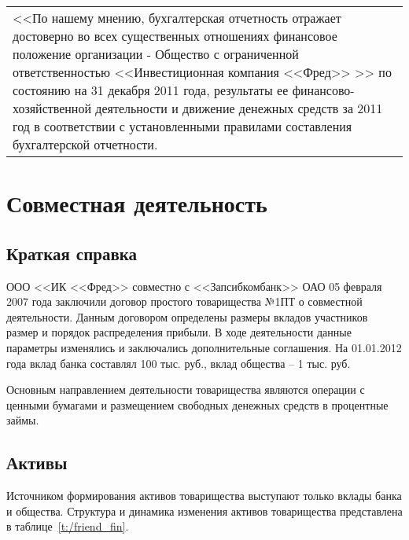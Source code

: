 \documentclass[a4paper,12pt]{scrreprt}
\begin{document}
\vspace{0.5em}

\sl
\footnotesize

\begin{tabular}{|p{}}
<<По нашему мнению, бухгалтерская отчетность отражает достоверно во всех существенных отношениях финансовое положение организации - Общество с ограниченной ответственностью <<Инвестиционная компания <<Фред>> >> по состоянию на 31 декабря 2011 года, результаты ее финансово-хозяйственной деятельности и движение денежных средств за 2011 год в соответствии с установленными правилами составления бухгалтерской отчетности.
\end{tabular}
\normalsize
\rm


\chapter{Совместная деятельность}

\section{Краткая справка}
ООО <<ИК <<Фред>> совместно с <<Запсибкомбанк>> ОАО 05 февраля 2007 года заключили договор простого товарищества №1ПТ о совместной деятельности. Данным договором определены размеры вкладов участников размер и порядок распределения прибыли. В ходе деятельности данные параметры изменялись и заключались дополнительные соглашения. На 01.01.2012 года вклад банка составлял 100 тыс. руб., вклад общества -- 1 тыс. руб.

Основным направлением деятельности товарищества являются операции с ценными бумагами и размещением свободных денежных средств в процентные займы.

\section{Активы}

Источником формирования активов товарищества выступают только вклады банка и общества. Структура и динамика изменения активов товарищества представлена в таблице~\ref{t:/friend_fin}.

\tablefont
\small
\end{document}
